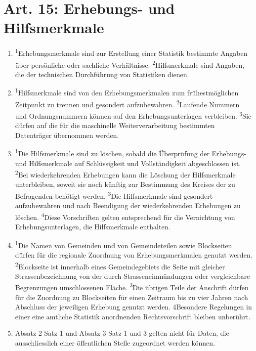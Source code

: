 \documentclass[A4, 12pt]{scrbook}
\begin{document}
    \section{Art. 15: Erhebungs- und Hilfsmerkmale}
        \begin{enumerate}[label=(\arabic*)]
            \item \textsuperscript{1}Erhebungsmerkmale sind zur Erstellung einer Statistik bestimmte Angaben über persönliche oder sachliche Verhältnisse. \textsuperscript{2}Hilfsmerkmale sind Angaben, die der technischen Durchführung von Statistiken dienen.
            \item \textsuperscript{1}Hilfsmerkmale sind von den Erhebungsmerkmalen zum frühestmöglichen Zeitpunkt zu trennen und gesondert aufzubewahren. \textsuperscript{2}Laufende Nummern und Ordnungsnummern können auf den Erhebungsunterlagen verbleiben. \textsuperscript{3}Sie dürfen auf die für die maschinelle Weiterverarbeitung bestimmten Datenträger übernommen werden.
            \item \textsuperscript{1}Die Hilfsmerkmale sind zu löschen, sobald die Überprüfung der Erhebungs- und Hilfsmerkmale auf Schlüssigkeit und Vollständigkeit abgeschlossen ist. \textsuperscript{2}Bei wiederkehrenden Erhebungen kann die Löschung der Hilfsmerkmale unterbleiben, soweit sie noch künftig zur Bestimmung des Kreises der zu Befragenden benötigt werden. \textsuperscript{3}Die Hilfsmerkmale sind gesondert aufzubewahren und nach Beendigung der wiederkehrenden Erhebungen zu löschen. \textsuperscript{4}Diese Vorschriften gelten entsprechend für die Vernichtung von Erhebungsunterlagen, die Hilfsmerkmale enthalten.
            \item \textsuperscript{1}Die Namen von Gemeinden und von Gemeindeteilen sowie Blockseiten dürfen für die regionale Zuordnung von Erhebungsmerkmalen genutzt werden. \textsuperscript{2}Blockseite ist innerhalb eines Gemeindegebiets die Seite mit gleicher Strassenbezeichnung von der durch Strasseneinmündungen oder vergleichbare Begrenzungen umschlossenen Fläche. \textsuperscript{3}Die übrigen Teile der Anschrift dürfen für die Zuordnung zu Blockseiten für einen Zeitraum bis zu vier Jahren nach Abschluss der jeweiligen Erhebung genutzt werden. 4Besondere Regelungen in einer eine amtliche Statistik anordnenden Rechtsvorschrift bleiben unberührt.
            \item Absatz 2 Satz 1 und Absatz 3 Satz 1 und 3 gelten nicht für Daten, die ausschliesslich einer öffentlichen Stelle zugeordnet werden können.
        \end{enumerate}   
    
\end{document}
